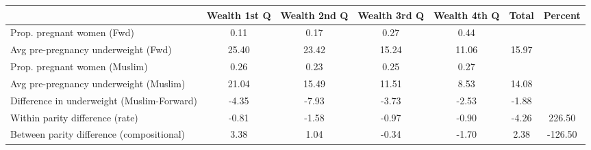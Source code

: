 \begin{tabular}{l*{6}{c}}
\toprule
            &\multicolumn{1}{c}{Wealth 1st Q}&\multicolumn{1}{c}{Wealth 2nd Q}&\multicolumn{1}{c}{Wealth 3rd Q}&\multicolumn{1}{c}{Wealth 4th Q}&\multicolumn{1}{c}{Total}&\multicolumn{1}{c}{Percent}\\
\midrule
\midrule
Prop. pregnant women (Fwd)&        0.11&        0.17&        0.27&        0.44&            &            \\
Avg pre-pregnancy underweight (Fwd)&       25.40&       23.42&       15.24&       11.06&       15.97&            \\
Prop. pregnant women (Muslim)&        0.26&        0.23&        0.25&        0.27&            &            \\
Avg pre-pregnancy underweight (Muslim)&       21.04&       15.49&       11.51&        8.53&       14.08&            \\
Difference in underweight (Muslim-Forward)&       -4.35&       -7.93&       -3.73&       -2.53&       -1.88&            \\
Within parity difference (rate)&       -0.81&       -1.58&       -0.97&       -0.90&       -4.26&      226.50\\
Between parity difference (compositional)&        3.38&        1.04&       -0.34&       -1.70&        2.38&     -126.50\\
\bottomrule
\end{tabular}
